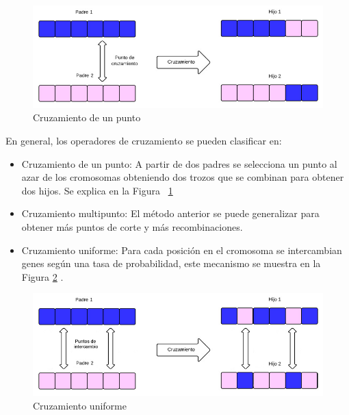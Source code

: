 \begin{figure}[H]
	\centering
	\includegraphics[width=\textwidth]{Figures/cruzamiento1}
	\caption{Cruzamiento de un punto}
	\label{fig:cruzamiento1}
\end{figure}

En general, los operadores de cruzamiento se pueden clasificar en:

\begin{itemize}
	\item Cruzamiento de un punto: A partir de dos padres se selecciona un punto al azar de los cromosomas obteniendo dos trozos que se combinan para obtener dos hijos. Se explica en la Figura ~\ref{fig:cruzamiento1}
	\item Cruzamiento multipunto: El método anterior se puede generalizar para obtener más puntos de corte y más recombinaciones.
	\item Cruzamiento uniforme: Para cada posición en el cromosoma se   intercambian genes según una tasa de probabilidad, este mecanismo se muestra en la Figura \ref{fig:cruzamiento_uniforme} .	
\end{itemize}



\begin{figure}[H]
	\centering
	\includegraphics[width=\textwidth]{Figures/cruzamiento_uniforme}
	\caption{Cruzamiento uniforme}
	\label{fig:cruzamiento_uniforme}
\end{figure}


